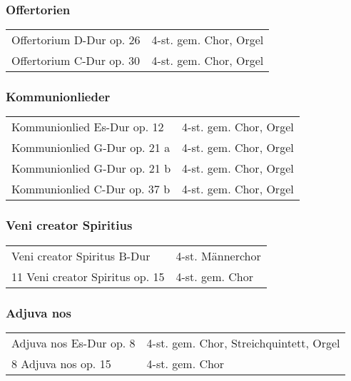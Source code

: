 \documentclass{book}
\begin{document}
\subsubsection{Offertorien}

\begin{tabular}{ll}
Offertorium D-Dur op. 26 &
4-st. gem. Chor, Orgel\\

Offertorium C-Dur op. 30 &
4-st. gem. Chor, Orgel\\
\end{tabular}

\subsubsection{Kommunionlieder}

\begin{tabular}{ll}
Kommunionlied Es-Dur op. 12 &
4-st. gem. Chor, Orgel\\

Kommunionlied G-Dur op. 21 a &
4-st. gem. Chor, Orgel\\

Kommunionlied G-Dur op. 21 b &
4-st. gem. Chor, Orgel\\

Kommunionlied C-Dur op. 37 b &
4-st. gem. Chor, Orgel\\
\end{tabular}

\subsubsection{Veni creator Spiritius}

\begin{tabular}{ll}
Veni creator Spiritus B-Dur &
4-st. Männerchor\\

11 Veni creator Spiritus op. 15 &
4-st. gem. Chor\\
\end{tabular}

\subsubsection{Adjuva nos}

\begin{tabular}{ll}
Adjuva nos Es-Dur op. 8 &
4-st. gem. Chor, Streichquintett, Orgel\\

8 Adjuva nos op. 15 &
4-st. gem. Chor\\
\end{tabular}
\end{document}
